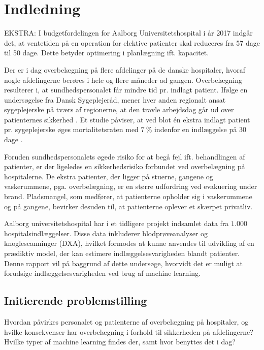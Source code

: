 \chapter{Indledning}

EKSTRA: 
I budgetfordelingen for Aalborg Universitetshospital i år 2017 indgår det, at ventetiden på en operation for elektive patienter skal reduceres fra 57 dage til 50 dage. \cite{Budget2016} Dette betyder optimering i planlægning ift. kapacitet.



Der er i dag overbelægning på flere afdelinger på de danske hospitaler, hvoraf nogle afdelingerne berøres i hele og flere måneder ad gangen. \cite{2015} Overbelægning resulterer i, at sundhedspersonalet får mindre tid pr. indlagt patient. Ifølge en undersøgelse fra Dansk Sygeplejeråd, mener hver anden regionalt ansat sygeplejerske på tværs af regionerne, at den travle arbejdsdag går ud over patienternes sikkerhed \cite{Kjeldsen2015}. Et studie påviser, at ved blot én ekstra indlagt patient pr. sygeplejerske øges mortalitetsraten med $7~\%$ indenfor en indlæggelse på 30 dage  \cite{Aiken2014}. 

Foruden sundhedspersonalets øgede risiko for at begå fejl ift. behandlingen af patienter, er der ligeledes en sikkerhedsrisiko forbundet ved overbelægning på hospitalerne. De ekstra patienter, der ligger på stuerne, gangene og vaskerummene, pga. overbelægning, er en større udfordring ved evakuering under brand. Pladsmangel, som medfører, at patienterne opholder sig i vaskerummene og på gangene, bevirker desuden til, at patienterne oplever et skærpet privatliv. \cite{Madsen2014}

Aalborg universitetshospital har i et tidligere projekt indsamlet data fra $1.000$ hospitalsindlæggelser. Disse data inkluderer blodprøveanalyser og knoglescanninger (DXA), hvilket formodes at kunne anvendes til udvikling af en prædiktiv model, der kan estimere indlæggelsesvarigheden blandt patienter. Denne rapport vil på baggrund af dette undersøge, hvorvidt det er muligt at forudsige indlæggelsesvarigheden ved brug af machine learning. 



\section{Initierende problemstilling} 
Hvordan påvirkes personalet og patienterne af overbelægning på hospitaler, og hvilke konsekvenser har overbelægning i forhold til sikkerheden på afdelingerne?
Hvilke typer af machine learning findes der, samt hvor benyttes det i dag?

